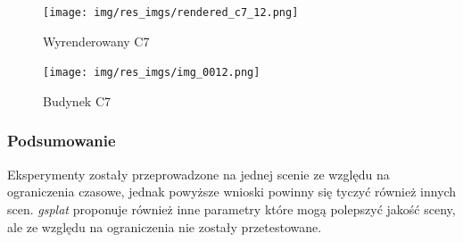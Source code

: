 \begin{figure}[!h]
    \centering
    \texttt{[image: img/res\_imgs/rendered\_c7\_12.png]}
    \caption{Wyrenderowany C7}\label{fig:c7_rend}
\end{figure}

\begin{figure}[!h]
    \centering
    \texttt{[image: img/res\_imgs/img\_0012.png]}
    \caption{Budynek C7}\label{fig:c7_gt}
\end{figure}

\newpage

\subsubsection{Podsumowanie}
Eksperymenty zostały przeprowadzone na jednej scenie ze względu na ograniczenia czasowe, jednak powyższe wnioski powinny się tyczyć również innych scen. \textit{gsplat} proponuje również inne parametry które mogą polepszyć jakość sceny, ale ze względu na ograniczenia nie zostały przetestowane. 